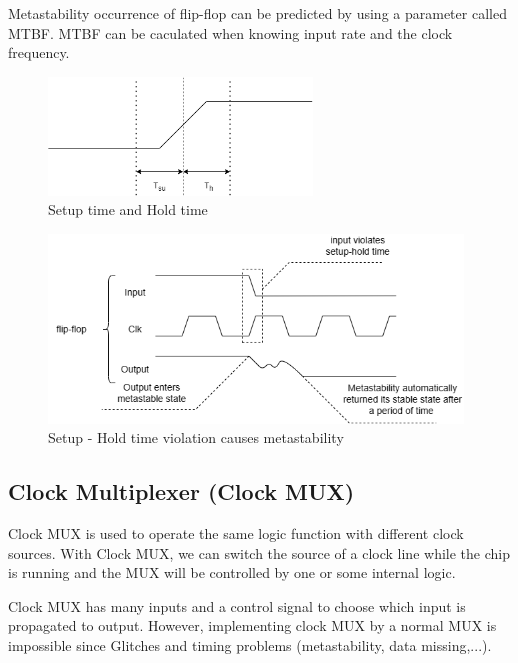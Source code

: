 \documentclass[a4paper, 12pt]{report}
\begin{document}
Metastability occurrence of flip-flop can be predicted by using a parameter called MTBF. MTBF can be caculated when knowing input rate and the clock frequency.
\begin{center}
    \begin{figure}[H]
        \begin{center}
            \includegraphics[width=7cm]{picture/CDC/setup-hold time.png}
        \end{center}
        \caption{Setup time and Hold time}
        \label{ref Figure}
    \end{figure}
    \begin{figure}[H]
        \begin{center}
            \includegraphics[width=11cm]{picture/CDC/metastability.png}
        \end{center}
        \caption{Setup - Hold time violation causes metastability}
        \label{ref Figure}
    \end{figure}
\end{center}



\subsection{Clock Multiplexer (Clock MUX)}
Clock MUX is used to operate the same logic function with different clock sources. With Clock MUX, we can switch the source of a clock line while the chip is running and the MUX will be controlled by one or some internal logic.

Clock MUX has many inputs and a control signal to choose which input is propagated to output. However, implementing clock MUX by a normal MUX is impossible since Glitches and timing problems (metastability, data missing,...).
\end{document}
